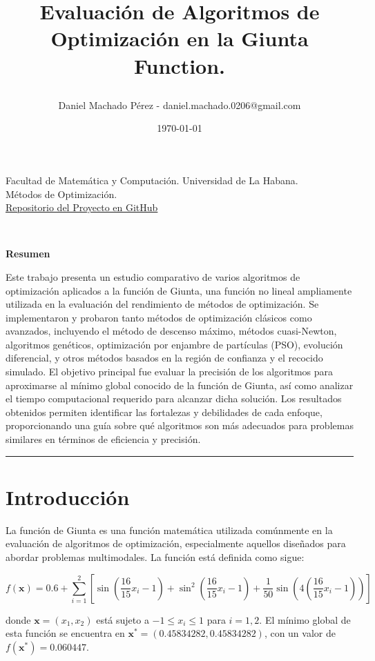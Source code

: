 \documentclass[fontsize=10pt]{article}
\title{

\Large Evaluación de Algoritmos de Optimización en la Giunta Function.  \\
[10pt] 
}
\date{\today}
\author{Daniel Machado Pérez - daniel.machado.0206@gmail.com }
\makeatletter
\renewenvironment{abstract} %
 {\small
  \begin{center}
  \bfseries Resumen
  \end{center}
  \begin{center}
  \begin{minipage}{0.9\textwidth}
  \vspace{-0.5em} 
  \item\relax}
 {\end{minipage}
  \end{center}
 }
\renewcommand{\maketitle}{\bgroup\setlength{\parindent}{0pt} %
\begin{flushleft}
  \begin{center}
    {\color{black} \Large Facultad de Matemática y Computación. Universidad de La Habana. \\
    \color{black} Métodos de Optimización. \\ \vspace{10pt}}
    \href{https://github.com/DanielMPMatCom/Giunta-Function-Algorithms.git}{Repositorio del Proyecto en GitHub} %
    \vspace{10pt}
  \end{center}
  \textbf{\@title}
  \@author \\ 
  \@date
\end{flushleft}\egroup
}
\makeatother
\begin{document}
\maketitle

\begin{abstract}

    Este trabajo presenta un estudio comparativo de 
    varios algoritmos de optimización aplicados a la 
    función de Giunta, una función no lineal 
    ampliamente utilizada en la evaluación del 
    rendimiento de métodos de optimización. 
    Se implementaron y probaron tanto métodos de 
    optimización clásicos como avanzados, incluyendo 
    el método de descenso máximo, métodos cuasi-Newton, 
    algoritmos genéticos, optimización por enjambre de 
    partículas (PSO), evolución diferencial, y otros 
    métodos basados en la región de confianza y el 
    recocido simulado. 
    El objetivo principal fue evaluar la precisión de 
    los algoritmos para aproximarse al mínimo global 
    conocido de la función de Giunta, así como 
    analizar el tiempo computacional requerido para 
    alcanzar dicha solución. Los resultados obtenidos 
    permiten identificar las fortalezas y debilidades 
    de cada enfoque, proporcionando una guía sobre qué 
    algoritmos son más adecuados para problemas 
    similares en términos de eficiencia y precisión.

\end{abstract}



\rule{\linewidth}{0.5pt}


\section{Introducción}

La función de Giunta es una función matemática 
utilizada comúnmente en la evaluación de algoritmos 
de optimización, especialmente aquellos diseñados 
para abordar problemas multimodales. La función está 
definida como sigue:

\[
f(\mathbf{x}) = 0.6 + \sum_{i=1}^{2} \left[ \sin\left(\frac{16}{15}x_i - 1\right) + \sin^2\left(\frac{16}{15}x_i - 1\right) + \frac{1}{50}\sin\left(4\left(\frac{16}{15}x_i - 1\right)\right) \right]
\]

donde \( \mathbf{x} = (x_1, x_2) \) está sujeto a \( -1 \leq x_i \leq 1 \) para \( i = 1, 2 \). El mínimo global de esta función se encuentra en \( \mathbf{x}^* = (0.45834282, 0.45834282) \), con un valor de \( f(\mathbf{x}^*) = 0.060447 \).
\end{document}
